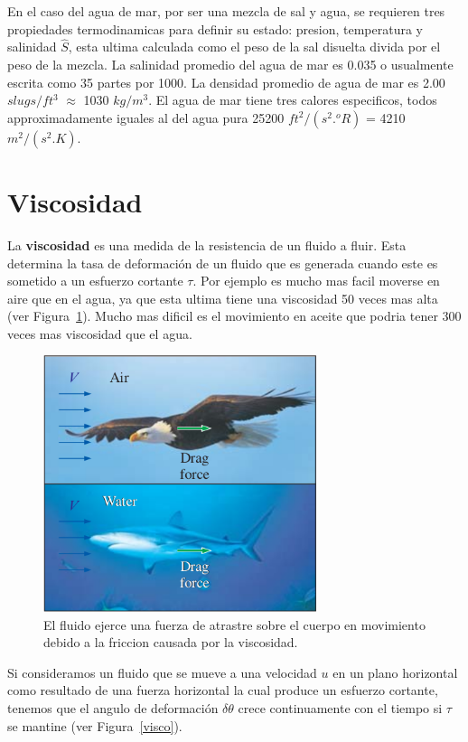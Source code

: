 \documentclass[10pt, oneside]{article}
\begin{document}
En el caso del agua de mar, por ser una mezcla de sal y agua, se requieren tres propiedades termodinamicas para definir su estado: presion, temperatura y salinidad $\hat{S}$, esta ultima calculada como el peso de la sal disuelta divida por el peso de la mezcla. La salinidad promedio del agua de mar es 0.035 o usualmente escrita como 35 partes por 1000. La densidad promedio de agua de mar es 2.00 $slugs/ft^3$ $\approx$ 1030 $kg/m^3$. El agua de mar tiene tres calores especificos, todos approximadamente iguales al del agua pura 25200 $ft^2/(s^2. ^oR)$ = 4210 $m^2/(s^2. K)$.

\section{Viscosidad}
La \textbf{viscosidad} es una medida de la resistencia de un fluido a fluir. Esta determina la tasa de deformaci\'on de un fluido que es generada cuando este es sometido a un esfuerzo cortante $\tau$. Por ejemplo es mucho mas facil moverse en aire que en el agua, ya que esta ultima tiene una viscosidad 50 veces mas alta (ver Figura~\ref{visco0}). Mucho mas dificil es el movimiento en aceite que podria tener 300 veces mas viscosidad que el agua. 

\begin{figure}[h]
\centering
\includegraphics[width=8cm]{visco0}
\caption{El fluido ejerce una fuerza de atrastre sobre el cuerpo en movimiento debido a la friccion causada por la viscosidad.}
\label{visco0}
\end{figure}



Si consideramos un fluido que se mueve a una velocidad $u$ en un plano horizontal como resultado de una fuerza horizontal la cual produce un esfuerzo cortante, tenemos que el angulo de deformaci\'on $\delta \theta$ crece continuamente con el tiempo si $\tau$ se mantine (ver Figura~\ref{visco}).
\end{document}
